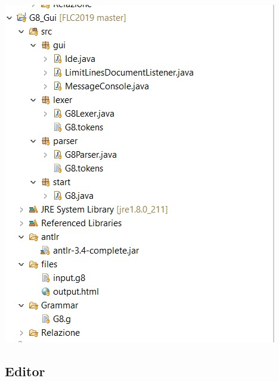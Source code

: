 \documentclass[a4paper]{article}
\begin{document}
\vspace{2\baselineskip}

\begin{center}
\includegraphics[scale=2.5]{progetto.jpg} 
\end{center}

\newpage

\subsection{Editor}
\end{document}
